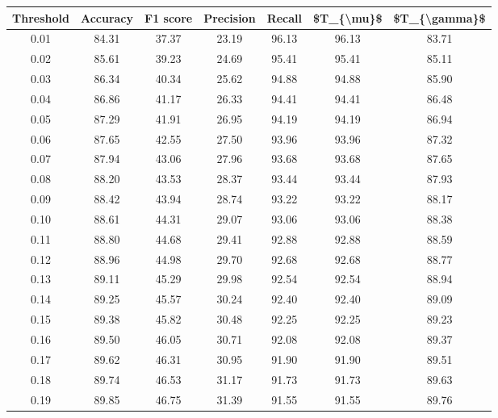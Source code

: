 \begin{tabular}{|c|c|c|c|c|c|c|}
\hline
 Threshold &  Accuracy &  F1 score &  Precision &  Recall &  \$T\_\{\textbackslash mu\}\$ &  \$T\_\{\textbackslash gamma\}\$ \\
\hline
      0.01 &     84.31 &     37.37 &      23.19 &   96.13 &      96.13 &         83.71 \\
      0.02 &     85.61 &     39.23 &      24.69 &   95.41 &      95.41 &         85.11 \\
      0.03 &     86.34 &     40.34 &      25.62 &   94.88 &      94.88 &         85.90 \\
      0.04 &     86.86 &     41.17 &      26.33 &   94.41 &      94.41 &         86.48 \\
      0.05 &     87.29 &     41.91 &      26.95 &   94.19 &      94.19 &         86.94 \\
      0.06 &     87.65 &     42.55 &      27.50 &   93.96 &      93.96 &         87.32 \\
      0.07 &     87.94 &     43.06 &      27.96 &   93.68 &      93.68 &         87.65 \\
      0.08 &     88.20 &     43.53 &      28.37 &   93.44 &      93.44 &         87.93 \\
      0.09 &     88.42 &     43.94 &      28.74 &   93.22 &      93.22 &         88.17 \\
      0.10 &     88.61 &     44.31 &      29.07 &   93.06 &      93.06 &         88.38 \\
      0.11 &     88.80 &     44.68 &      29.41 &   92.88 &      92.88 &         88.59 \\
      0.12 &     88.96 &     44.98 &      29.70 &   92.68 &      92.68 &         88.77 \\
      0.13 &     89.11 &     45.29 &      29.98 &   92.54 &      92.54 &         88.94 \\
      0.14 &     89.25 &     45.57 &      30.24 &   92.40 &      92.40 &         89.09 \\
      0.15 &     89.38 &     45.82 &      30.48 &   92.25 &      92.25 &         89.23 \\
      0.16 &     89.50 &     46.05 &      30.71 &   92.08 &      92.08 &         89.37 \\
      0.17 &     89.62 &     46.31 &      30.95 &   91.90 &      91.90 &         89.51 \\
      0.18 &     89.74 &     46.53 &      31.17 &   91.73 &      91.73 &         89.63 \\
      0.19 &     89.85 &     46.75 &      31.39 &   91.55 &      91.55 &         89.76 \\

\end{tabular}
